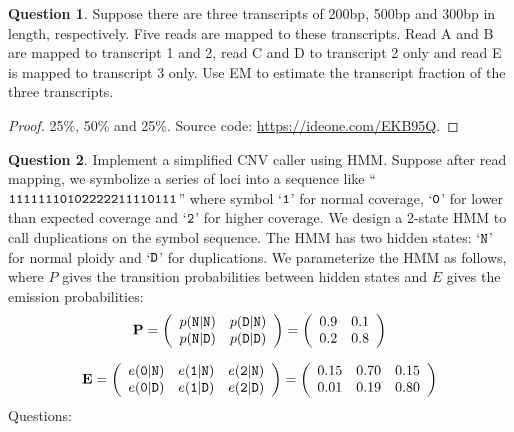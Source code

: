 \documentclass{article}[10pt]
\theoremstyle{definition}\newtheorem{question}{Question}
\begin{document}
\begin{question}
Suppose there are three transcripts of 200bp, 500bp and 300bp in length, respectively.
Five reads are mapped to these transcripts. Read A and B are mapped to transcript 1 and 2,
read C and D to transcript 2 only and read E is mapped to transcript 3 only.
Use EM to estimate the transcript fraction of the three transcripts.
\end{question}

\begin{proof}
25\%, 50\% and 25\%. Source code: \href{https://ideone.com/EKB95Q}{https://ideone.com/EKB95Q}.
\end{proof}



\begin{question}
Implement a simplified CNV caller using HMM. Suppose after read mapping, we
symbolize a series of loci into a sequence like ``${\tt
11111110102222211110111}$'' where symbol `${\tt 1}$' for normal coverage,
`${\tt 0}$' for lower than expected coverage and `${\tt 2}$' for higher
coverage. We design a 2-state HMM to call duplications on the symbol sequence.
The HMM has two hidden states: `${\tt N}$' for normal ploidy and `${\tt D}$' for
duplications. We parameterize the HMM as follows, where $P$ gives the transition
probabilities between hidden states and $E$ gives the emission probabilities:
$$
{\bf P}=\left(\begin{array}{ll}
p({\tt N}|{\tt N}) & p({\tt D}|{\tt N}) \\
p({\tt N}|{\tt D}) & p({\tt D}|{\tt D})
\end{array}\right)
=\left(\begin{array}{ll}
0.9 & 0.1 \\
0.2 & 0.8
\end{array}\right)
$$
\end{question}
$$
{\bf E}=\left(\begin{array}{lll}
e({\tt 0}|{\tt N}) & e({\tt 1}|{\tt N}) & e({\tt 2}|{\tt N})\\
e({\tt 0}|{\tt D}) & e({\tt 1}|{\tt D}) & e({\tt 2}|{\tt D})
\end{array}\right)
=\left(\begin{array}{lll}
0.15 & 0.70 & 0.15\\
0.01 & 0.19 & 0.80
\end{array}\right)
$$
Questions:
\end{document}

